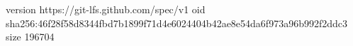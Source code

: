 version https://git-lfs.github.com/spec/v1
oid sha256:46f28f58d8344fbd7b1899f71d4e6024404b42ae8e54da6f973a96b992f2ddc3
size 196704
